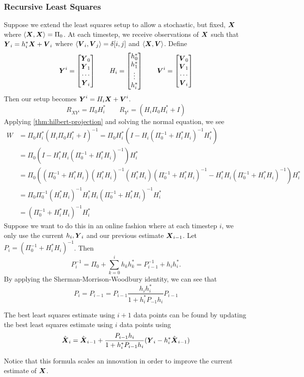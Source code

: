 \subsubsection{Recursive Least Squares}
Suppose we extend the least squares setup to allow a stochastic, but fixed, $\boldsymbol{X}$ where $\langle \boldsymbol{X}, \boldsymbol{X} \rangle = \Pi_0$.
At each timestep, we receive observations of $\boldsymbol{X}$ such that $\boldsymbol{Y}_i = h_i^* \boldsymbol{X} + \boldsymbol{V}_i$ where $\langle \boldsymbol{V}_i, \boldsymbol{V}_j \rangle = \delta[i, j]$ and $\langle \boldsymbol{X}, \boldsymbol{V} \rangle$.
Define \[
	\boldsymbol{Y}^i = \begin{bmatrix} \boldsymbol{Y}_0 \\ \boldsymbol{Y}_1 \\ \cdots \\ \boldsymbol{Y}_i \end{bmatrix}
	\qquad 
	H_i = \begin{bmatrix} 
		h_0^*\\
		h_1^*\\
		\vdots\\
		h_i^*\\
	\end{bmatrix}
	\qquad
	\boldsymbol{V}^i = \begin{bmatrix} \boldsymbol{V}_0 \\ \boldsymbol{V}_1 \\ \cdots \\ \boldsymbol{V}_i \end{bmatrix}
\]
Then our setup becomes $\boldsymbol{Y}^i= H_i \boldsymbol{X} + \boldsymbol{V}^i$.
\[
	R_{XY^i} = \Pi_0 H_i^* \qquad R_{Y^i} = (H_i\Pi_0H_i^* + I)
\]
Applying \cref{thm:hilbert-projection} and solving the normal equation, we see
\begin{align*}
	W &= \Pi_0 H_i^*(H_i\Pi_0H_i^* + I)^{-1} = \Pi_0 H_i^* (I - H_i(\Pi_0^{-1} + H_i^*H_i)^{-1}H_i^*)\\
	&= \Pi_0 (I - H_i^*H_i(\Pi_0^{-1} + H_i^*H_i)^{-1})H_i^* \\
	&= \Pi_0 ((\Pi_0^{-1} + H_i^*H_i)(H_i^*H_i)^{-1}(H_i^*H_i)(\Pi_0^{-1} + H_i^*H_i)^{-1}- H_i^*H_i(\Pi_0^{-1} + H_i^*H_i)^{-1})H_i^*\\
	&= \Pi_0 \Pi_0^{-1}(H_i^*H_i)^{-1}H_i^*H_i(\Pi_0^{-1}+H_i^*H_i)^{-1}H_i^*\\
	&= (\Pi_0^{-1} + H_i^* H_i)^{-1}H_i^*
\end{align*}
Suppose we want to do this in an online fashion where at each timestep $i$, we only use the current $h_i, \boldsymbol{Y}_i$ and our previous estimate $\boldsymbol{X}_{i-1}$.
Let $P_i = (\Pi_0^{-1} + H_i^*H_i)^{-1}$.
Then \[
	P_i^{-1} = \Pi_0 + \sum_{k=0}^i h_k h_k^* = P_{i-1}^{-1} + h_ih_i^*.
\]
By applying the Sherman-Morrison-Woodbury identity, we can see that
\[
	P_i = P_{i-1} = P_{i-1} \frac{h_ih_i^*}{1 + h_i^*P_{-1}h_i} P_{i-1}
\]
\begin{theorem}
	The best least squares estimate using $i+1$ data points can be found by updating the best least squares estimate using $i$ data points using
	\[
		\hat{\boldsymbol{X}}_i = \hat{\boldsymbol{X}}_{i-1} + \frac{P_{i-1}h_i}{1 + h_i^*P_{i-1}h_i}(\boldsymbol{Y}_i - h_i^* \hat{\boldsymbol{X}}_{i-1})
	\]
	\label{thm:rls:update}
\end{theorem}
Notice that this formula scales an innovation in order to improve the current estimate of $\boldsymbol{X}$.

